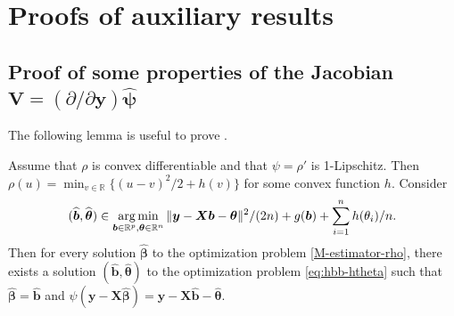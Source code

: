 \documentclass[11pt]{amsart}
\numberwithin{equation}{section}
\numberwithin{equation}{section}
\def\argmin{\mathop{\rm arg\, min}}
\def\argmin{\mathop{\rm arg\, min}}
\def\real{{\mathbb{R}}}
\def\R{{\real}}
\def\mathbold{\boldsymbol} %
\def\bb{\mathbold{b}}\def\bhat{\widehat{b}}\def\btil{\widetilde{b}}
\def\hbb{{\widehat{\bb}}}\def\tbb{{\widetilde{\bb}}}\def\bbbar{{\overline \bb}}
\def\bV{\mathbold{V}}\def\hbV{{\widehat{\bV}}}\def\tbV{{\widetilde{\bV}}}
\def\bX{\mathbold{X}}\def\hbX{{\widehat{\bX}}}\def\tbX{{\widetilde{\bX}}}\def\bXbar{{\overline \bX}}
\def\by{\mathbold{y}}\def\yhat{\widehat{y}}\def\ytil{\widetilde{y}}\def\ybar{{\overline y}}\def\vby{{\bf y}}
\def\bbeta{\mathbold{\beta}}\def\betahat{\widehat{\beta}}\def\hbeta{\widehat{\beta}}
\def\hbbeta{{{\widehat{\bbeta}}}}
\def\btheta{\mathbold{\theta}}\def\thetahat{\widehat{\theta}}\def\htheta{\widehat{\theta}}
\def\hbtheta{{\widehat{\btheta}}}\def\tbtheta{{\widetilde{\btheta}}}
\def\bpsi{\mathbold{\psi}}\def\psihat{\widehat{\psi}}\def\hpsi{\widehat{\psi}}
\def\hbpsi{{\widehat{\bpsi}}}\def\tbpsi{{\widetilde{\bpsi}}}
\def\argmin{\mathop{\rm arg\, min}}
\begin{document}
\section{Proofs of auxiliary results}

\subsection{Proof of some properties of the Jacobian
    \texorpdfstring{$\bV=(\partial/\partial\by)\hbpsi$}{of psi}
}
\label{sec:proof-jacobian-psd}

\PropPsiPsd*

The following lemma is useful
to prove .
\begin{lemma}
    \label{lemma:jacobian-psd-htheta-FULL}
    Assume that $\rho$ is convex differentiable  and that $\psi=\rho'$ is 1-Lipschitz.
    Then $\rho(u)=\min_{v\in\R}\{(u-v)^2/2 + h(v) \}$  for some convex
    function $h$. Consider 
    \begin{equation}
        \label{eq:hbb-htheta}
    (\hbb,\hbtheta) \in \argmin_{\bb\in\R^p,\btheta\in\R^n}
    \|\by-\bX\bb - \btheta\|^2/(2n) + g(\bb) + \sum_{i=1}^n h(\theta_i)/n.
    \end{equation}
    Then for every solution $\hbbeta$ to the optimization problem
    \eqref{M-estimator-rho},
    there exists a solution
    $(\hbb,\hbtheta)$ to the optimization problem \eqref{eq:hbb-htheta}
    such that
    $\hbbeta=\hbb$ and $\psi(\by-\bX\hbbeta) = \by-\bX\hbb-\hbtheta$.
\end{lemma}
\end{document}
